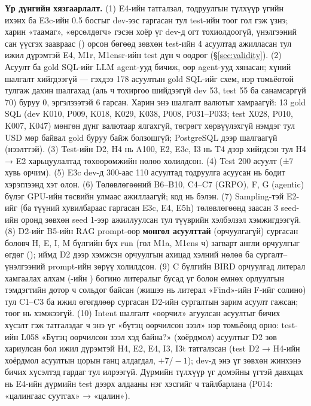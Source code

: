 \textbf{Үр дүнгийн хязгаарлалт.}\label{sec:limitations}\label{sec:deviations}
(1) E4-ийн татгалзал, тодруулгын түлхүүр үгийн ихэнх ба E3c-ийн 0.5 босгыг dev-ээс гаргасан тул test-ийн тоог гол гэж
үзнэ; харин «таамаг», «өрсөлдөгч» гэсэн хоёр үг dev-д огт тохиолдоогүй, үнэлгээний сан үүсгэх заавраас
() орсон бөгөөд зөвхөн test-ийн 4 асуултад ажилласан тул ижил дүрэмтэй E4, M1r, M1ensr-ийн test
дүн ч өөдрөг (§\ref{sec:validity}).
(2) Асуулт ба gold SQL-ийг LLM agent-ууд бичиж, өөр agent-ууд хянасан; хүний шалгалт хийгдээгүй — гэхдээ 178 асуултын gold SQL-ийг схем, нэр томьёотой тулгаж дахин шалгахад (аль ч тохиргоо шийдээгүй dev 53, test 55 ба санамсаргүй 70) буруу 0, эргэлзээтэй 6 гарсан. Харин энэ шалгалт валютыг
хамраагүй: 13 gold SQL (dev K010, P009, K018, K029, K038, P008, P031--P033; test X028, P010, K007, K047) мөнгөн дүнг
валютаар ялгахгүй, төгрөгт хөрвүүлэхгүй нэмдэг тул USD мөр байвал gold буруу байж болзошгүй; PostgreSQL дээр шалгаагүй
(нээлттэй). (3) Test-ийн D2, H4 нь
A100, E2, E3c, I3 нь T4 дээр хийгдсэн тул H4 → E2 харьцуулалтад төхөөрөмжийн нөлөө холилдсон. (4) Test 200 асуулт
(±7 хувь орчим). (5) E3c dev-д 300-аас 110 асуултад тодруулга асуусан нь бодит хэрэглээнд хэт олон. (6) Төлөвлөгөөний
B6--B10, C4--C7 (GRPO), F, G (agentic) бүлэг GPU-ийн төсвийн улмаас ажиллаагүй; код нь бэлэн.
(7) Sampling-тэй E2-ийг (ба түүний хувилбараас гаргасан E3c, E4, E5h) төлөвлөгөөнд заасан 3 seed-ийн оронд зөвхөн seed
1-ээр ажиллуулсан тул түүврийн хэлбэлзэл хэмжигдээгүй. (8) D2-ийг B5-ийн RAG prompt-оор \textbf{монгол асуулттай}
(орчуулгагүй) сургасан боловч H, E, I, M бүлгийн бүх run (гол M1a, M1ens ч) загварт англи орчуулгыг өгдөг
(); иймд D2 дээр хэмжсэн орчуулгын ахицад хэлний нөлөө ба сургалт--үнэлгээний prompt-ийн зөрүү
холилдсон. (9) C бүлгийн BIRD орчуулгад литерал хамгаалах алхам (-ийн ) богино
литералыг бусад үг болон өмнөх орлуулгын тэмдэгтийн дотор ч сольдог байсан (жишээ нь  литерал «Find»-ийн F-ийг
солино) тул C1--C3 ба ижил өгөгдлөөр сургасан D2-ийн сургалтын зарим асуулт гажсан; тоог нь хэмжээгүй. (10) Intent
шалгалт «өөрчил» агуулсан асуултыг бичих хүсэлт гэж татгалздаг ч энэ үг «бүтэц өөрчилсөн зээл» нэр томьёонд орно: test-ийн
L058 «Бүтэц өөрчилсөн зээл хэд байна?» (хоёрдмол) асуултыг D2 зөв хариулсан бол ижил дүрэмтэй H4, E2, E4, I3, I3t
татгалзсан (test D2 → H4-ийн хоёрдмол асуултын цорын ганц алдагдал, $+7/-1$); dev-д энэ үг зөвхөн жинхэнэ бичих хүсэлтэд
гардаг тул илрээгүй. Дүрмийн түлхүүр үг домэйны үгтэй давхцах нь E4-ийн дүрмийн test дээрх алдааны нэг хэсгийг ч
тайлбарлана (P014: «цалингаас суутгах» → «цалин»).

